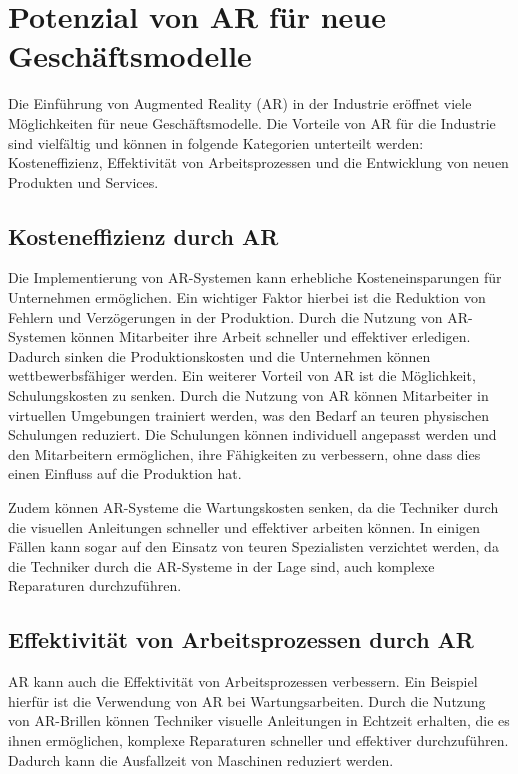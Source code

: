 \section{Potenzial von AR für neue Geschäftsmodelle}

Die Einführung von Augmented Reality (AR) in der Industrie eröffnet viele
Möglichkeiten für neue Geschäftsmodelle. Die Vorteile von AR für die Industrie
sind vielfältig und können in folgende Kategorien unterteilt werden:
Kosteneffizienz, Effektivität von Arbeitsprozessen und die Entwicklung von
neuen Produkten und Services.

\subsection{Kosteneffizienz durch AR}
Die Implementierung von AR-Systemen kann erhebliche Kosteneinsparungen für
Unternehmen ermöglichen. Ein wichtiger Faktor hierbei ist die Reduktion von
Fehlern und Verzögerungen in der Produktion. Durch die Nutzung von AR-Systemen
können Mitarbeiter ihre Arbeit schneller und effektiver erledigen. Dadurch
sinken die Produktionskosten und die Unternehmen können wettbewerbsfähiger
werden. Ein weiterer Vorteil von AR ist die Möglichkeit, Schulungskosten zu
senken. Durch die Nutzung von AR können Mitarbeiter in virtuellen Umgebungen
trainiert werden, was den Bedarf an teuren physischen Schulungen reduziert. Die
Schulungen können individuell angepasst werden und den Mitarbeitern
ermöglichen, ihre Fähigkeiten zu verbessern, ohne dass dies einen Einfluss auf
die Produktion hat.

Zudem können AR-Systeme die Wartungskosten senken, da die Techniker durch die
visuellen Anleitungen schneller und effektiver arbeiten können. In einigen
Fällen kann sogar auf den Einsatz von teuren Spezialisten verzichtet werden, da
die Techniker durch die AR-Systeme in der Lage sind, auch komplexe Reparaturen
durchzuführen.

\subsection{Effektivität von Arbeitsprozessen durch AR}
AR kann auch die Effektivität von Arbeitsprozessen verbessern. Ein Beispiel
hierfür ist die Verwendung von AR bei Wartungsarbeiten. Durch die Nutzung von
AR-Brillen können Techniker visuelle Anleitungen in Echtzeit erhalten, die es
ihnen ermöglichen, komplexe Reparaturen schneller und effektiver durchzuführen.
Dadurch kann die Ausfallzeit von Maschinen reduziert werden.

